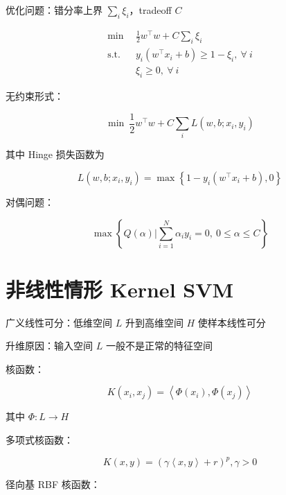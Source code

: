 \documentclass[openany,a4paper,12pt]{ctexbook}
\theoremstyle{kaiti}
\theoremstyle{normal}
\begin{document}
优化问题：错分率上界 $\sum_i\xi_i$，tradeoff $C$

\begin{equation}
  \begin{aligned}
    \min~~&\frac{1}{2}w^{\top}w+C\sum_i\xi_i\\
    \mathrm{s.t.}~~& y_i\left(w^{\top}x_i+b \right)\geqslant 1-\xi_i,~\forall~i\\
    &\xi_i\geqslant 0,~\forall~i
  \end{aligned}
\end{equation}

无约束形式：

\begin{equation}
  \min~\frac{1}{2}w^{\top}w+C\sum_iL\left(w,b;x_i,y_i \right)
\end{equation}

其中 Hinge 损失函数为

\begin{equation}
  L\left(w,b;x_i,y_i \right)=\max \left\{ 1-y_i\left(w^{\top}x_i+b \right),0 \right\}
\end{equation}

对偶问题：

\begin{equation}
  \max \left\{ Q\left(\alpha \right)|\sum_{i=1}^{N}\alpha_iy_i=0,~0\leqslant \alpha \leqslant C \right\}
\end{equation}

\section{非线性情形 Kernel SVM}

广义线性可分：低维空间 $L$ 升到高维空间 $H$ 使样本线性可分

升维原因：输入空间 $L$ 一般不是正常的特征空间

核函数：

\begin{equation}
  K\left(x_i,x_j \right)=\left< \Phi \left(x_i \right),\Phi \left(x_j \right)\right>
\end{equation}

其中 $\Phi :L\rightarrow H$

多项式核函数：

\begin{equation}
  K\left(x,y \right)=\left(\gamma \left< x,y \right> +r \right)^p, \gamma >0
\end{equation}

径向基 RBF 核函数：
\end{document}
